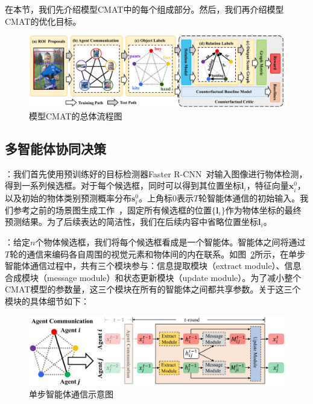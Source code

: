 在本节，我们先介绍模型CMAT中的每个组成部分。然后，我们再介绍模型CMAT的优化目标。

\begin{figure}[t]
    \centering
    \includegraphics[width=\linewidth]{chapter4/res/architecture.pdf}
    \caption{模型CMAT的总体流程图}
    \label{ch4:fig:architecture}
\end{figure}

\subsection{多智能体协同决策}

\textbf{}：我们首先使用预训练好的目标检测器Faster R-CNN~\cite{ren2015faster}对输入图像进行物体检测，得到一系列候选框。对于每个候选框，同时可以得到其位置坐标$\bm{l}_i$，特征向量$\bm{x}^0_i$，以及初始的物体类别预测概率分布$\bm{s}^0_i$。上角标$0$表示$T$轮智能体通信的初始输入。我们参考之前的场景图生成工作~\cite{xu2017scene, zellers2018neural}，固定所有候选框的位置$\{\bm{l}_i\}$作为物体坐标的最终预测结果。为了后续表达的简洁性，我们在后续内容中省略位置坐标$\bm{l}_i$。


\textbf{}：给定$n$个物体候选框，我们将每个候选框看成是一个智能体。智能体之间将通过$T$轮的通信来编码各自周围的视觉元素和物体间的内在联系。如图~\ref{ch4:fig:communication}所示，在单步智能体通信过程中，共有三个模块参与：信息提取模块（extract module）、信息合成模块（message module）和状态更新模块（update module）。为了减小整个CMAT模型的参数量，这三个模块在所有的智能体之间都共享参数。关于这三个模块的具体细节如下：

\begin{figure}[t]
    \centering
    \includegraphics[width=\linewidth]{chapter4/res/communication.pdf}
    \caption{单步智能体通信示意图}
    \label{ch4:fig:communication}
\end{figure}


